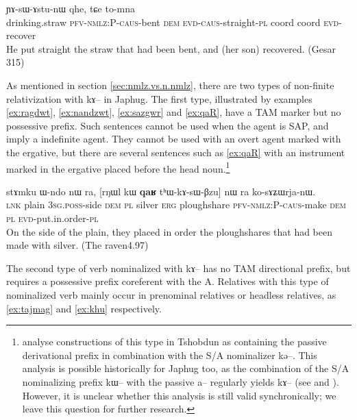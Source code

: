 \documentclass[oldfontcommands,oneside,a4paper,11pt]{article}
\newcommand{\ipa}[1]{{\phon #1}} %
\newcommand{\topic}{\textsc{dem}}
\begin{document}
     \begin{exe}
   \ex \label{ex:sazgwr}
\gll [\textbf{\ipa{cʰɤmdɤru}}  	\ipa{tɤ-kɤ-sɯ-ɤzgɯr}]  	\ipa{nɯ}  	\ipa{ɲɤ-sɯ-ɤstu-nɯ}  	\ipa{qhe,}  	\ipa{tɕe}  	\ipa{to-mna}  \\
drinking.straw \textsc{pfv-nmlz:P-caus}-bent \topic{} \textsc{evd-caus}-straight-\textsc{pl} coord coord \textsc{evd}-recover \\
\glt He put straight the straw that  had been bent, and (her son) recovered. (Gesar 315)
   \end{exe}  
   

As mentioned in section \ref{sec:nmlz.vs.n.nmlz}, there are two types of  non-finite relativization with \ipa{kɤ}-- in Japhug. The first type, illustrated by examples  \ref{ex:ragdwt}, \ref{ex:nandzwt}, \ref{ex:sazgwr} and \ref{ex:qaR}, have a TAM marker but no possessive prefix. Such sentences cannot be used when the agent is  SAP, and imply a indefinite agent. They cannot be used with an overt agent marked with the ergative, but there are several sentences such as \ref{ex:qaR} with an instrument marked in the ergative placed before the head noun.\footnote{ \citet{jacksonlin07} analyse constructions of this type in Tshobdun as   containing the passive derivational prefix in combination with the S/A nominalizer \ipa{kə}--. This analysis is possible historically for Japhug too, as the combination of the S/A nominalizing prefix \ipa{kɯ}-- with the passive \ipa{a}-- regularly yields \ipa{kɤ}-- (see \citealt{jacques07passif} and \citealt{jacques12demotion}). However, it is unclear whether this analysis is still valid synchronically; we leave this question for further research.}

\begin{exe}
   \ex \label{ex:qaR}
\gll  \ipa{tɕe}  	\ipa{stɤmku}  	\ipa{ɯ-ndo}  	\ipa{nɯ} \ipa{ra,}  	[\ipa{rŋɯl}  	\ipa{kɯ}  	\textbf{\ipa{qaʁ}}  	\ipa{tʰɯ-kɤ-sɯ-βzu}] 	\ipa{nɯ} \ipa{ra}  	\ipa{ko-sɤʑɯrja-nɯ.}   \\
\textsc{lnk} plain \textsc{3sg.poss}-side \textsc{dem} \textsc{pl} 
silver \textsc{erg} ploughshare \textsc{pfv-nmlz:P-caus}-make  \textsc{dem} \textsc{pl} \textsc{evd}-put.in.order-\textsc{pl}\\
  \glt On the side of the plain, they placed in order the ploughshares that had been made with silver. (The raven4.97)
   \end{exe}  


The second type of verb nominalized with \ipa{kɤ}-- has no TAM directional prefix, but requires a possessive prefix coreferent with the A. Relatives with this type of nominalized verb mainly occur in prenominal relatives or headless relatives, as \ref{ex:tajmag} and \ref{ex:khu} respectively.
\end{document}
